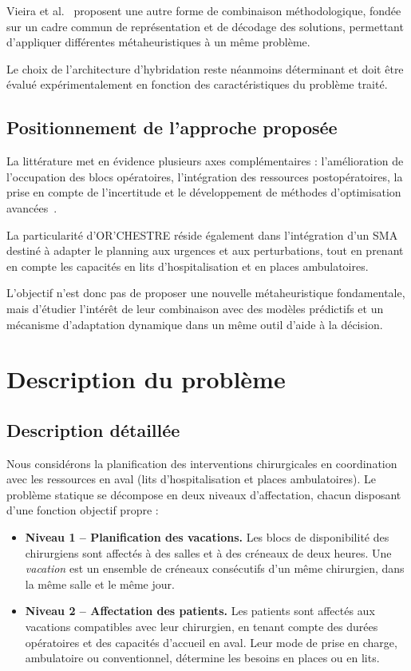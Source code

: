 \documentclass[11pt,a4paper]{article}
\begin{document}
Vieira et al.~\cite{vieira2025} proposent une autre forme de combinaison méthodologique, fondée sur un cadre commun de représentation et de décodage des solutions, permettant d'appliquer différentes métaheuristiques à un même problème.

Le choix de l'architecture d'hybridation reste néanmoins déterminant et doit être évalué expérimentalement en fonction des caractéristiques du problème traité.

\subsection{Positionnement de l'approche proposée}

La littérature met en évidence plusieurs axes complémentaires : l'amélioration de l'occupation des blocs opératoires, l'intégration des ressources postopératoires, la prise en compte de l'incertitude et le développement de méthodes d'optimisation avancées~\cite{alamin2025,vieira2025}.

La particularité d'OR'CHESTRE réside également dans l'intégration d'un SMA destiné à adapter le planning aux urgences et aux perturbations, tout en prenant en compte les capacités en lits d'hospitalisation et en places ambulatoires.

L'objectif n'est donc pas de proposer une nouvelle métaheuristique fondamentale, mais d'étudier l'intérêt de leur combinaison avec des modèles prédictifs et un mécanisme d'adaptation dynamique dans un même outil d'aide à la décision.


\section{Description du problème}
\label{sec:problem}

\subsection{Description détaillée}

Nous considérons la planification des interventions chirurgicales en coordination avec les ressources en aval (lits d'hospitalisation et places ambulatoires). Le problème statique se décompose en deux niveaux d'affectation, chacun disposant d'une fonction objectif propre :

\begin{itemize}
    \item \textbf{Niveau 1 -- Planification des vacations.} Les blocs de disponibilité des chirurgiens sont affectés à des salles et à des créneaux de deux heures. Une \emph{vacation} est un ensemble de créneaux consécutifs d'un même chirurgien, dans la même salle et le même jour.

    \item \textbf{Niveau 2 -- Affectation des patients.} Les patients sont affectés aux vacations compatibles avec leur chirurgien, en tenant compte des durées opératoires et des capacités d'accueil en aval. Leur mode de prise en charge, ambulatoire ou conventionnel, détermine les besoins en places ou en lits.
\end{itemize}
\end{document}
